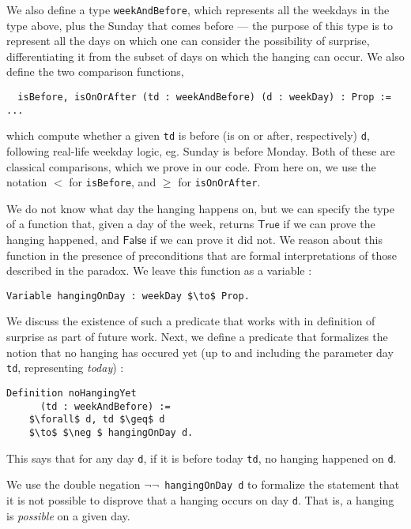 \documentclass[journal]{journal}
\begin{document}
We also define a type {\tt weekAndBefore}, which represents all the weekdays in
the type above, plus the Sunday that comes before --- the purpose of this type is to
represent all the days on which one can consider the possibility of surprise,
differentiating it from the subset of days on which the hanging can occur. We
also define the two comparison functions,

\begin{lstlisting}
  isBefore, isOnOrAfter (td : weekAndBefore) (d : weekDay) : Prop := ...
\end{lstlisting}

which compute whether a given {\tt td} is before (is on or after, respectively) {\tt d},
following real-life weekday logic, eg. Sunday is before Monday.
Both of these are classical comparisons, which we prove in our code.
From here on, we use the notation $<$ for {\tt isBefore}, and
$\geq$ for {\tt isOnOrAfter}.

We do not know what day the hanging happens on, but we can specify the type of a
function that, given a day of the week, returns $\mathsf{True}$ if we can prove the hanging
happened, and $\mathsf{False}$ if we can prove it did not. We reason about this function
in the presence of preconditions that are formal interpretations of those described
in the paradox. We leave this function as a variable :

\begin{lstlisting}[mathescape=true]
  Variable hangingOnDay : weekDay $\to$ Prop.
\end{lstlisting}

We discuss the existence of such a predicate that
works with in definition of surprise as part of future work.
Next, we define a predicate that formalizes the notion that no hanging has occured
yet (up to and including the parameter day {\tt td}, representing \emph{today}) :

\begin{lstlisting}[mathescape=true]
  Definition noHangingYet
      (td : weekAndBefore) :=
    $\forall$ d, td $\geq$ d
    $\to$ $\neg $ hangingOnDay d.
\end{lstlisting}

This says that for any day {\tt d}, if it is before today {\tt td}, no hanging
happened on {\tt d}.

We use the double negation {\tt $\neg \neg$ hangingOnDay d} to formalize the statement that it is
not possible to disprove that a hanging occurs on day {\tt d}. That is, a hanging
is \emph{possible} on a given day.
\end{document}

